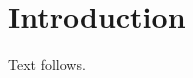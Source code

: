 \documentclass{scrbook}
\begin{document}
\chapter{Introduction}
\thispagestyle{empty}
Text follows.
\end{document}
